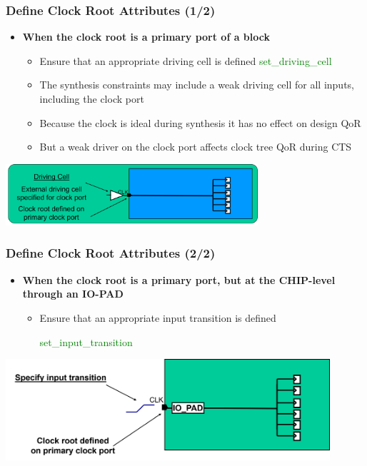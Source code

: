 \documentclass[compress]{beamer}
\begin{document}
\begin{frame}
	\frametitle{Define Clock Root Attributes (1/2)}
	\begin{itemize}
		\item \textbf{When the clock root is a primary port of a block}
		\begin{itemize}
			\item Ensure that an appropriate driving cell is defined
			\textcolor{green}{set\_driving\_cell }
			\item The synthesis constraints may include a weak driving cell for all inputs, including the clock port
			\item Because the clock is ideal during synthesis it has no effect on design QoR
			\item But a weak driver on the clock port affects clock tree QoR during CTS
		\end{itemize}
	\end{itemize}
\begin{center}
	\includegraphics[width=0.7\textwidth]{root}
\end{center}
\end{frame}
\begin{frame}
	\frametitle{Define Clock Root Attributes (2/2)}
		\begin{itemize}
	\item \textbf{When the clock root is a primary port, but at the CHIP-level through an IO-PAD}
		\begin{itemize}
		\item Ensure that an appropriate input transition is defined
		
		\textcolor{green}{set\_input\_transition  }
	\end{itemize}
\end{itemize}
\begin{center}
\includegraphics[width=0.9\textwidth]{IO-PAD}
\end{center}
\end{frame}
\end{document}
